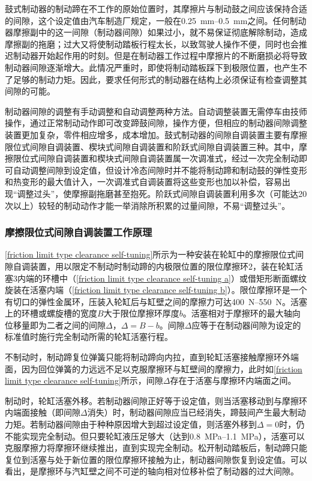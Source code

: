 \documentclass[UTF8]{ctexart}
\numberwithin{figure}{section}
\numberwithin{table}{section}
\begin{document}
鼓式制动器的制动蹄在不工作的原始位置时，其摩擦片与制动鼓之间应该保持合适的间隙，这个设定值由汽车制造厂规定，一般在\qtyrange[range-phrase = $\,\sim\,$, range-units = single]{0.25}{0.5}{\mm}之间。任何制动器摩擦副中的这一间隙（制动器间隙）如果过小，就不易保证彻底解除制动，造成摩擦副的拖磨；过大又将使制动踏板行程太长，以致驾驶人操作不便，同时也会推迟制动器开始起作用的时刻。但是在制动器工作过程中摩擦片的不断磨损必将导致制动器间隙逐渐增大。此情况严重时，即使将制动踏板踩下到极限位置，也产生不了足够的制动力矩。因此，要求任何形式的制动器在结构上必须保证有检查调整其间隙的可能。

制动器间隙的调整有手动调整和自动调整两种方法。自动调整装置无需停车由技师操作，通过正常制动动作即可改变蹄鼓间隙，操作方便，但相应的制动器间隙调整装置更加复杂，零件相应增多，成本增加。鼓式制动器的间隙自调装置主要有摩擦限位式间隙自调装置、楔块式间隙自调装置和阶跃式间隙自调装置三种。其中，摩擦限位式间隙自调装置和楔块式间隙自调装置属一次调准式，经过一次完全制动即可自动调整间隙到设定值，但设计冷态间隙时并不能将制动蹄和制动鼓的弹性变形和热变形的最大值计入，一次调准式自调装置将这些变形也加以补偿，容易出现“调整过头”，使摩擦副拖磨甚至抱死。阶跃式间隙自调装置利用多次（可能达20次以上）较轻的制动动作才能一举消除所积累的过量间隙，不易“调整过头”。

\subsubsection{摩擦限位式间隙自调装置工作原理}

\cref{friction limit type clearance self-tuning}所示为一种安装在轮缸中的摩擦限位式间隙自调装置，用以限定不制动时制动蹄的内极限位置的限位摩擦环2，装在轮缸活塞3内端的环槽中（\cref{friction limit type clearance self-tuning a}）或借矩形断面螺纹旋装在活塞内端（\cref{friction limit type clearance self-tuning b}）。限位摩擦环是一个有切口的弹性金属环，压装入轮缸后与缸壁之间的摩擦力可达\qtyrange[range-phrase = $\,\sim\,$, range-units = single]{400}{550}{\newton}。活塞上的环槽或螺旋槽的宽度$B$大于限位摩擦环厚度$b$。活塞相对于摩擦环的最大轴向位移量即为二者之间的间隙$\Delta$，$\Delta=B-b$。间隙$\Delta$应等于在制动器间隙为设定的标准值时施行完全制动所需的轮缸活塞行程。

不制动时，制动蹄复位弹簧只能将制动蹄向内拉，直到轮缸活塞接触摩擦环外端面，因为回位弹簧的力远远不足以克服摩擦环与缸壁间的摩擦力，此时如\cref{friction limit type clearance self-tuning}所示，间隙$\Delta$存在于活塞与摩擦环内端面之间。

制动时，轮缸活塞外移。若制动器间隙正好等于设定值，则当活塞移动到与摩擦环内端面接触（即间隙$\Delta$消失）时，制动器间隙应当已经消失，蹄鼓间产生最大制动力矩。若制动器间隙由于种种原因增大到超过设定值，则活塞外移到$\Delta=0$时，仍不能实现完全制动。但只要轮缸液压足够大（达到\qtyrange[range-phrase = $\,\sim\,$, range-units = single]{0.8}{1.1}{\mega\pascal}），活塞可以克服摩擦力将摩擦环继续推出，直到实现完全制动。松开制动踏板后，制动蹄只能复位到活塞与处于新位置的限位摩擦环接触为止，制动器间隙恢复到设定值。可以看出，是摩擦环与汽缸壁之间不可逆的轴向相对位移补偿了制动器的过大间隙。
\end{document}

